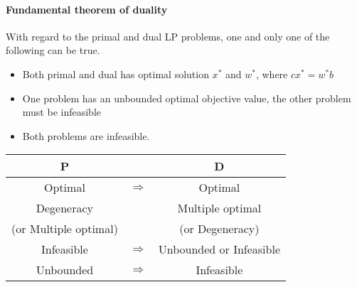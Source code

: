            \paragraph{Fundamental theorem of duality}
                With regard to the primal and dual LP problems, one and only one of the following can be true. 

                \begin{itemize}
                    \item Both primal and dual has optimal solution $x^*$ and $w^*$, where $cx^* = w^*b$
                    \item One problem has an unbounded optimal objective value, the other problem must be infeasible
                    \item Both problems are infeasible.
                \end{itemize}

                \begin{table}[!htp]
                    \centering
                    \begin{tabular}{|c|c|c|}
                        \hline P & & D \\
                        \hline Optimal & $\Rightarrow$ & Optimal \\
                        Degeneracy & & Multiple optimal \\
                        (or Multiple optimal) & & (or Degeneracy) \\
                        \hline Infeasible & $\Rightarrow$ & Unbounded or Infeasible \\
                        \hline Unbounded & $\Rightarrow$ & Infeasible \\
                        \hline
                    \end{tabular}
                \end{table}


